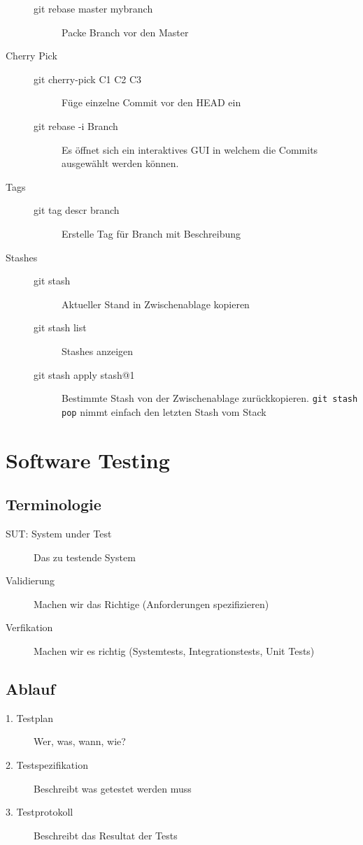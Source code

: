 \begin{description}
	\begin{description}
		\item[git rebase master mybranch] Packe Branch vor den Master
	\end{description}
	\item[Cherry Pick] \hfill
		\begin{description}
			\item[git cherry-pick C1 C2 C3] Füge einzelne Commit vor den HEAD ein
			\item[git rebase -i Branch] Es öffnet sich ein interaktives GUI in welchem die Commits ausgewählt werden können.
		\end{description}
	\item[Tags] \hfill
		\begin{description}
			\item[git tag descr branch] Erstelle Tag für Branch mit Beschreibung
		\end{description}
	\item[Stashes] \hfill
	\begin{description}
		\item[git stash] Aktueller Stand in Zwischenablage kopieren
		\item[git stash list] Stashes anzeigen		
		\item[git stash apply stash@{1}] Bestimmte Stash von der Zwischenablage zurückkopieren. \lstinline|git stash pop| nimmt einfach den letzten Stash vom Stack
	\end{description}
\end{description}

\section{Software Testing}
\subsection{Terminologie}
\begin{description}
	\item[SUT: System under Test] Das zu testende System
	\item[Validierung] Machen wir das Richtige (Anforderungen spezifizieren)
	\item[Verfikation] Machen wir es richtig (Systemtests, Integrationstests, Unit Tests)
\end{description}

\subsection{Ablauf}	
\begin{description}
	\item[1. Testplan] Wer, was, wann, wie?
	\item[2. Testspezifikation] Beschreibt was getestet werden muss
	\item[3. Testprotokoll] Beschreibt das Resultat der Tests
\end{description}

